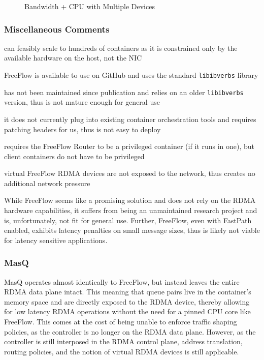 \documentclass[12pt,titlepage]{article}
\begin{document}
\begin{figure}
	\centering
	\caption{Bandwidth + CPU with Multiple Devices}%
	\label{fig:softroce_multi_vdev}
\end{figure}

\subsubsection*{Miscellaneous Comments}
\begin{description}[nolistsep,font={{\scshape\bfseries}}]
	\item[Scalability Limits] can feasibly scale to hundreds of containers as it is constrained only by the available hardware on the host, not the NIC
	\item[Proprietary] FreeFlow is available to use on GitHub and uses the standard \texttt{libibverbs} library
	\item[Maturity] has not been maintained since publication and relies on an older \texttt{libibverbs} version, thus is not mature enough for general use
	\item[Ease in Deployment] it does not currently plug into existing container orchestration tools and requires patching headers for us, thus is not easy to deploy
	\item[Execution Privileges] requires the FreeFlow Router to be a privileged container (if it runs in one), but client containers do not have to be privileged
	\item[Network Pressure] virtual FreeFlow RDMA devices are not exposed to the network, thus creates no additional network pressure
\end{description}

While FreeFlow seems like a promising solution and does not rely on the RDMA hardware capabilities, it suffers from being an unmaintained research project and is, unfortunately, not fit for general use.
Further, FreeFlow, even with FastPath enabled, exhibits latency penalties on small message sizes, thus is likely not viable for latency sensitive applications.

\subsubsection{MasQ}
MasQ operates almost identically to FreeFlow, but instead leaves the entire RDMA data plane intact.
This meaning that queue pairs live in the container's memory space and are directly exposed to the RDMA device, thereby allowing for low latency RDMA operations without the need for a pinned CPU core like FreeFlow.
This comes at the cost of being unable to enforce traffic shaping policies, as the controller is no longer on the RDMA data plane.
However, as the controller is still interposed in the RDMA control plane, address translation, routing policies, and the notion of virtual RDMA devices is still applicable.
\end{document}
